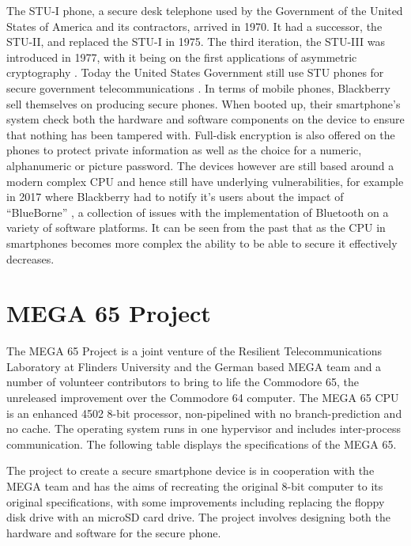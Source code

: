 	The STU-I phone, a secure desk telephone used by the Government of the United States of America and its contractors, arrived in 1970. It had a successor, the STU-II, and replaced the STU-I in 1975. The third iteration, the STU-III was introduced in 1977, with it being on the first applications of asymmetric cryptography \cite{RN30}. Today the United States Government still use STU phones for secure government telecommunications \cite{RN30}.
	In terms of mobile phones, Blackberry sell themselves on producing secure phones. When booted up, their smartphone’s system check both the hardware and software components on the device to ensure that nothing has been tampered with. Full-disk encryption is also offered on the phones to protect private information as well as the choice for a numeric, alphanumeric or picture password. The devices however are still based around a modern complex CPU and hence still have underlying vulnerabilities, for example in 2017 where Blackberry had to notify it’s users about the impact of “BlueBorne” \cite{RN20}, a collection of issues with the implementation of Bluetooth on a variety of software platforms. 
	It can be seen from the past that as the CPU in smartphones becomes more complex the ability to be able to secure it effectively decreases. 


\section{MEGA 65 Project}

	The MEGA 65 Project is a joint venture of the Resilient Telecommunications Laboratory at Flinders University and the German based MEGA team and a number of volunteer contributors to bring to life the Commodore 65, the unreleased improvement over the Commodore 64 computer. The MEGA 65 CPU is an enhanced 4502 8-bit processor, non-pipelined with no branch-prediction and no cache. The operating system runs in one hypervisor and includes inter-process communication. The following table displays the specifications of the MEGA 65. 



	The project to create a secure smartphone device is in cooperation with the MEGA team and has the aims of recreating the original 8-bit computer to its original specifications, with some improvements including replacing the floppy disk drive with an microSD card drive. The project involves designing both the hardware and software for the secure phone. 

